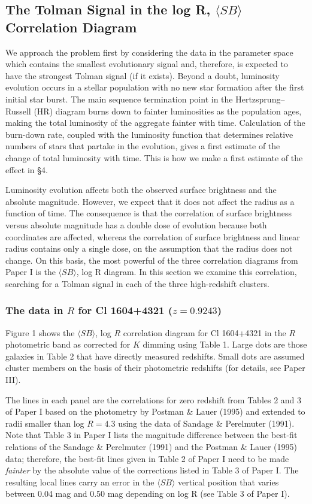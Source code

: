 \documentclass[preprint]{aastex}
\begin{document}
\subsection{The Tolman Signal in the log R, $\langle SB \rangle$ 
Correlation Diagram}

We approach the problem first by considering the data in the parameter
space which contains the smallest evolutionary signal and, therefore,
is expected to have the strongest Tolman signal (if it exists). Beyond
a doubt, luminosity evolution occurs in a stellar population with no
new star formation after the first initial star burst. The main
sequence termination point in the Hertzsprung--Russell (HR) diagram
burns down to fainter luminosities as the population ages, making the
total luminosity of the aggregate fainter with time. Calculation of
the burn-down rate, coupled with the luminosity function that
determines relative numbers of stars that partake in the evolution,
gives a first estimate of the change of total luminosity with
time. This is how we make a first estimate of the effect in \S 4.

Luminosity evolution affects both the observed surface brightness and
the absolute magnitude. However, we expect that it does not affect the
radius as a function of time. The consequence is that the correlation
of surface brightness versus absolute magnitude has a double dose of
evolution because both coordinates are affected, whereas the
correlation of surface brightness and linear radius contains only a
single dose, on the assumption that the radius does not change.  On
this basis, the most powerful of the three correlation diagrams from
Paper I is the $\langle SB \rangle$, log R diagram. In this section we
examine this correlation, searching for a Tolman signal in each of the
three high-redshift clusters.

\subsubsection{The data in $R$ for Cl 1604+4321 ($z = 0.9243$)}

Figure 1 shows the $\langle SB \rangle$, log $R$ correlation diagram
for Cl 1604+4321 in the $R$ photometric band as corrected for $K$
dimming using Table 1. Large dots are those galaxies in Table 2 that
have directly measured redshifts. Small dots are assumed cluster
members on the basis of their photometric redshifts (for details, see
Paper III). 

The lines in each panel are the correlations for zero redshift from
Tables 2 and 3 of Paper I based on the photometry by Postman \& Lauer
(1995) and extended to radii smaller than log $R = 4.3$ using the data
of Sandage \& Perelmuter (1991). Note that Table 3 in Paper I lists
the magnitude difference between the best-fit relations of the Sandage
\& Perelmuter (1991) and the Postman \& Lauer (1995) data; therefore,
the best-fit lines given in Table 2 of Paper I need to be made {\it
fainter} by the absolute value of the corrections listed in Table 3 of
Paper I. The resulting local lines carry an error in the $\langle SB
\rangle$ vertical position that varies between 0.04 mag and 0.50 mag
depending on log R (see Table 3 of Paper I).
\end{document}
